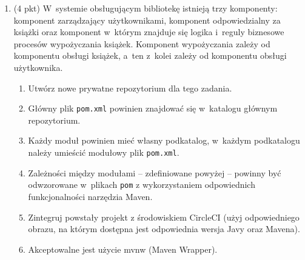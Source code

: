 \documentclass[12pt]{article}
\begin{document}
\begin{enumerate}
        \item\label{exc:maven}
            (4 pkt) W~systemie obsługującym bibliotekę istnieją trzy komponenty: komponent zarządzający użytkownikami, komponent odpowiedzialny za książki oraz komponent w~którym znajduje się logika i~reguly biznesowe procesów wypożyczania książek. Komponent wypożyczania zależy od komponentu obsługi książek, a~ten z~kolei zależy od komponentu obsługi użytkownika.
            \begin{enumerate}
                \item Utwórz nowe prywatne repozytorium dla tego zadania.
                \item Główny plik \texttt{pom.xml} powinien znajdować się w~katalogu głównym repozytorium.
                \item Każdy moduł powinien mieć własny podkatalog, w~każdym podkatalogu należy umieścić modułowy plik \texttt{pom.xml}.
                \item Zależności między modułami -- zdefiniowane powyżej -- powinny być odwzorowane w~plikach \texttt{pom} z wykorzystaniem odpowiednich funkcjonalności narzędzia Maven.
                \item Zintegruj powstały projekt z środowiskiem CircleCI (użyj odpowiedniego obrazu, na którym dostępna jest odpowiednia wersja Javy oraz Mavena).
                \item Akceptowalne jest użycie mvnw (Maven Wrapper).
            \end{enumerate}

    \end{enumerate}
\end{document}
